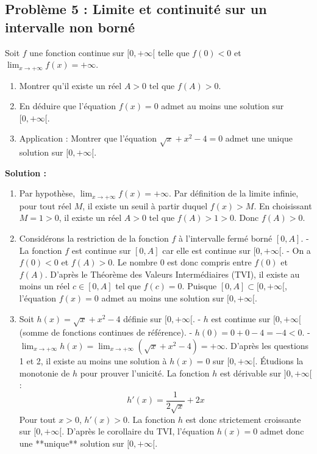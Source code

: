 \subsection*{Problème 5 : Limite et continuité sur un intervalle non borné}
Soit $f$ une fonction continue sur $[0, +\infty[$ telle que $f(0) < 0$ et $\lim_{x \to +\infty} f(x) = +\infty$.
\begin{enumerate}
    \item Montrer qu'il existe un réel $A > 0$ tel que $f(A) > 0$.
    \item En déduire que l'équation $f(x) = 0$ admet au moins une solution sur $[0, +\infty[$.
    \item Application : Montrer que l'équation $\sqrt{x} + x^2 - 4 = 0$ admet une unique solution sur $[0, +\infty[$.
\end{enumerate}

\textbf{Solution :}
\begin{enumerate}
    \item Par hypothèse, $\lim_{x \to +\infty} f(x) = +\infty$.
    Par définition de la limite infinie, pour tout réel $M$, il existe un seuil à partir duquel $f(x) > M$.
    En choisissant $M = 1 > 0$, il existe un réel $A > 0$ tel que $f(A) > 1 > 0$. Donc $f(A) > 0$.
    
    \item Considérons la restriction de la fonction $f$ à l'intervalle fermé borné $[0, A]$.
    - La fonction $f$ est continue sur $[0, A]$ car elle est continue sur $[0, +\infty[$.
    - On a $f(0) < 0$ et $f(A) > 0$. Le nombre 0 est donc compris entre $f(0)$ et $f(A)$.
    D'après le Théorème des Valeurs Intermédiaires (TVI), il existe au moins un réel $c \in [0, A]$ tel que $f(c) = 0$.
    Puisque $[0, A] \subset [0, +\infty[$, l'équation $f(x) = 0$ admet au moins une solution sur $[0, +\infty[$.
    
    \item Soit $h(x) = \sqrt{x} + x^2 - 4$ définie sur $[0, +\infty[$.
    - $h$ est continue sur $[0, +\infty[$ (somme de fonctions continues de référence).
    - $h(0) = 0 + 0 - 4 = -4 < 0$.
    - $\lim_{x \to +\infty} h(x) = \lim_{x \to +\infty} (\sqrt{x} + x^2 - 4) = +\infty$.
    D'après les questions 1 et 2, il existe au moins une solution à $h(x) = 0$ sur $[0, +\infty[$.
    Étudions la monotonie de $h$ pour prouver l'unicité. La fonction $h$ est dérivable sur $]0, +\infty[$ :
    \[
    h'(x) = \frac{1}{2\sqrt{x}} + 2x
    \]
    Pour tout $x > 0$, $h'(x) > 0$. La fonction $h$ est donc strictement croissante sur $[0, +\infty[$.
    D'après le corollaire du TVI, l'équation $h(x) = 0$ admet donc une **unique** solution sur $[0, +\infty[$.
\end{enumerate}

